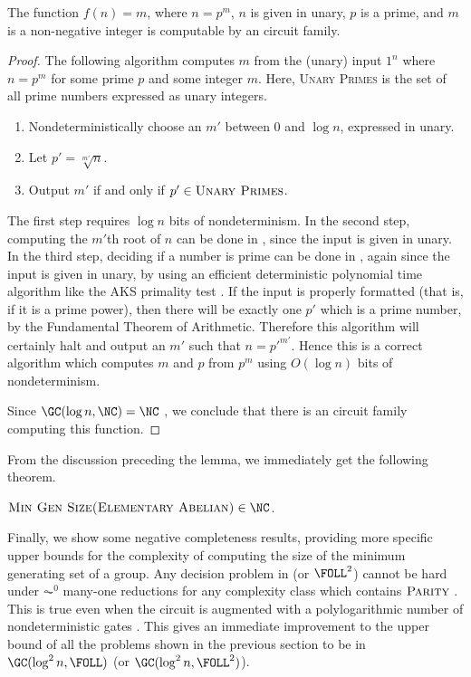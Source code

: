 \documentclass{article}
\begin{document}
\begin{lemma}
  The function $f(n) = m$, where $n = p^m$, $n$ is given in unary, $p$ is a prime, and $m$ is a non-negative integer is computable by an \NC{} circuit family.
\end{lemma}
\begin{proof}
  The following algorithm computes $m$ from the (unary) input $1^n$ where $n = p^m$ for some prime $p$ and some integer $m$.
  Here, \textsc{Unary Primes} is the set of all prime numbers expressed as unary integers.
  \begin{enumerate}
  \item Nondeterministically choose an $m'$ between 0 and $\log n$, expressed in unary.
  \item Let $p' = \sqrt[m']{n}$.
  \item Output $m'$ if and only if $p' \in \textsc{Unary Primes}$.
  \end{enumerate}
  The first step requires $\log n$ bits of nondeterminism.
  In the second step, computing the $m'$th root of $n$ can be done in \NC{}, since the input is given in unary.
  In the third step, deciding if a number is prime can be done in \NC{}, again since the input is given in unary, by using an efficient deterministic polynomial time algorithm like the AKS primality test \cite{aks04}.
  If the input is properly formatted (that is, if it is a prime power), then there will be exactly one $p'$ which is a prime number, by the Fundamental Theorem of Arithmetic.
  Therefore this algorithm will certainly halt and output an $m'$ such that $n = {p'}^{m'}$.
  Hence this is a correct \NC{} algorithm which computes $m$ and $p$ from $p^m$ using $O(\log n)$ bits of nondeterminism.

  Since $\GC(\log n, \NC) = \NC$ \cite[Theorem~2.3]{wolf94}, we conclude that there is an \NC{} circuit family computing this function.
\end{proof}

From the discussion preceding the lemma, we immediately get the following theorem.

\begin{theorem}\label{thm:eainnc}
  $\textsc{Min Gen Size(Elementary Abelian)} \in \NC$.
\end{theorem}

Finally, we show some negative completeness results, providing more specific upper bounds for the complexity of computing the size of the minimum generating set of a group.
Any decision problem in \FOLL{} (or $\FOLL^2$) cannot be hard under $\AC^0$ many-one reductions for any complexity class which contains $\textsc{Parity}$ \cite[Section~2.2]{bklm01}.
This is true even when the circuit is augmented with a polylogarithmic number of nondeterministic gates \cite[Section~4]{ctw10}.
This gives an immediate improvement to the upper bound of all the problems shown in the previous section to be in $\GC(\log^2 n, \FOLL)$ (or $\GC(\log^2 n, \FOLL^2)$).
\end{document}

